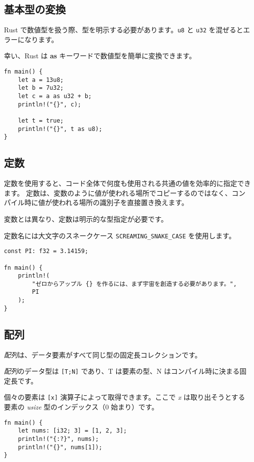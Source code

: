 \subsection{基本型の変換}

Rust で数値型を扱う際、型を明示する必要があります。\texttt{u8} と
\texttt{u32} を混ぜるとエラーになります。

幸い、Rust は \textbf{as} キーワードで数値型を簡単に変換できます。

\begin{verbatim}
fn main() {
    let a = 13u8;
    let b = 7u32;
    let c = a as u32 + b;
    println!("{}", c);

    let t = true;
    println!("{}", t as u8);
}
\end{verbatim}

\subsection{定数}

定数を使用すると、コード全体で何度も使用される共通の値を効率的に指定できます。
定数は、変数のように値が使われる場所でコピーするのではなく、コンパイル時に値が使われる場所の識別子を直接置き換えます。

変数とは異なり、定数は明示的な型指定が必要です。

定数名には大文字のスネークケース \texttt{SCREAMING\_SNAKE\_CASE}
を使用します。

\begin{verbatim}
const PI: f32 = 3.14159;

fn main() {
    println!(
        "ゼロからアップル {} を作るには、まず宇宙を創造する必要があります。",
        PI
    );
}
\end{verbatim}

\subsection{配列}

\emph{配列}は、データ要素がすべて同じ型の固定長コレクションです。

\emph{配列}のデータ型は \texttt{{[}T;N{]}} であり、T は要素の型、N
はコンパイル時に決まる固定長です。

個々の要素は \texttt{{[}x{]}} 演算子によって取得できます。ここで
\emph{x} は取り出そうとする要素の \emph{usize} 型のインデックス（0
始まり）です。

\begin{verbatim}
fn main() {
    let nums: [i32; 3] = [1, 2, 3];
    println!("{:?}", nums);
    println!("{}", nums[1]);
}
\end{verbatim}

